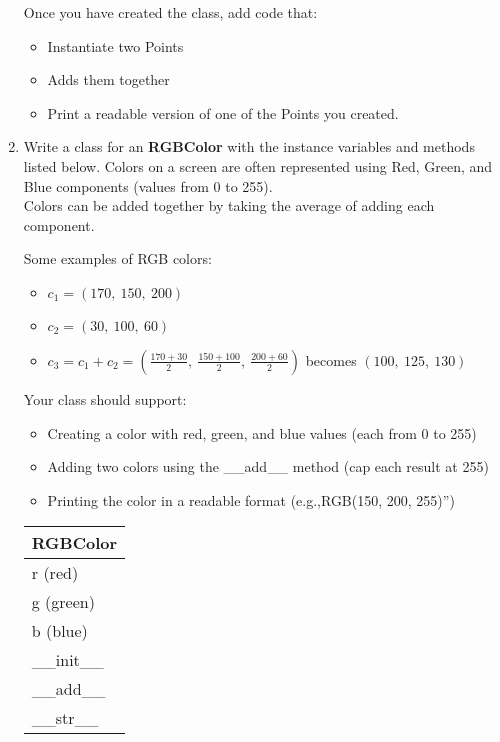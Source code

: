\documentclass{article}
\newcommand{\csq}[1]{\reflectbox{''}#1''}  %
\begin{document}
\begin{enumerate}
		Once you have created the class, add code that:
		\begin{itemize}
			\item Instantiate two Points
			\item Adds them together
			\item Print a readable version of one of the Points you created.
		\end{itemize}



	\item
		Write a class for an \textbf{RGBColor} with the instance variables and methods listed 
		below. Colors on a screen are often represented using Red, Green, and Blue components 
		(values from 0 to 255).\\
		Colors can be added together by taking the average of adding each component.

		\begin{minipage}[t]{0.7\textwidth}
			Some examples of RGB colors:
			\begin{itemize}
				\item $c_1 = (170,\ 150,\ 200)$
				\item $c_2 = (30,\ 100,\ 60)$
				\item $c_3 = c_1 + c_2 = (\frac{170+30}{2},\ \frac{150+100}{2},\ \frac{200+60}{2})$ 
					becomes $(100,\ 125,\ 130)$
			\end{itemize}
		
			Your class should support:
			\begin{itemize}
				\item Creating a color with red, green, and blue values (each from 0 to 255)
				\item Adding two colors using the \_\_add\_\_ method (cap each result at 255)
				\item Printing the color in a readable format (e.g.,\csq{RGB(150, 200, 255)})
			\end{itemize}
		\end{minipage}
		\hfill
		\begin{minipage}[t]{0.25\textwidth}
			\vspace{.2em}
			\begin{flushright}
				\begin{tabular}{|l|}
					\hline
					RGBColor \\ \hline
					r (red) \\
					g (green) \\
					b (blue) \\ \hline
					\_\_init\_\_ \\
					\_\_add\_\_ \\
					\_\_str\_\_ \\ \hline
				\end{tabular}
			\end{flushright}
		\end{minipage}
		

\end{enumerate}
\end{document}
